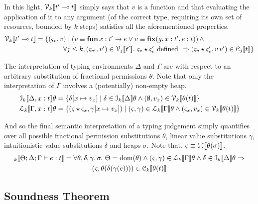In this light, $\mathcal{V}_{k} [\![ t' \multimap t ]\!]$ simply says
that $v$ is a function and that evaluating the application of it to any
argument (of the correct type, requiring its own set of resources, bounded by
$k$ steps) satisfies all the aforementioned properties.
\begin{align*}
    \mathcal{V}_{k} [\![  t' \multimap t  ]\!] &= \{ (\varsigma_v, v ) \mid ( v \equiv \mathbf{fun}\, x : t' \rightarrow e \vee v \equiv \mathbf{fix} (g, x : t' , e : t) ) \, \wedge\\
                            & \qquad \qquad \forall j \leq k, (\varsigma_{v'}, v') \in \mathcal{V}_{j} [\![  t'  ]\!].\ \varsigma_v \star \varsigma_v' \textrm{ defined } \Rightarrow (\varsigma_v \star \varsigma_v', v\, v') \in \mathcal{C}_{j} [\![ t ]\!] \}
\end{align*}

The interpretation of typing environments $\Delta$ and $\Gamma$ are with
respect to an arbitrary substitution of fractional permissions $\theta$. Note
that only the interpretation of $\Gamma$ involves a (potentially) non-empty heap.
\begin{align*}
    \den{I}{k}{ \Delta, x : t } \theta &= \{ \delta[x \mapsto v_x ] \mid \delta \in \den{I}{k}{\Delta}\theta \wedge (\empH, v_x) \in \V{k}{\theta(t)} \} \\
    \den{L}{k}{ \Gamma, x : t } \theta &= \{ (\varsigma \star \varsigma_x, \gamma[x \mapsto v_x ]) \mid (\varsigma, \gamma) \in \den{L}{k}{\Gamma}\theta \wedge (\varsigma_x, v_x) \in \V{k}{\theta(t)} \}
\end{align*}

And so the final semantic interpretation of a typing judgement simply
quantifies over all possible fractional permission substitutions $\theta$,
linear value substitutions $\gamma$, intuitionistic value substitutions
$\delta$ and heaps $\sigma$. Note that, $\varsigma \equiv \mathcal{H}_{} [\![ \theta(\sigma) ]\!]$.
\begin{align*}
\den{}{k}{ \Theta; \Delta ; \Gamma \vdash e : t } &= \forall \theta, \delta, \gamma, \sigma.\ \Theta = \dom(\theta) \wedge (\varsigma, \gamma) \in \den{L}{k}{ \Gamma }\theta \wedge \delta \in \den{I}{k}{ \Delta }\theta \Rightarrow \\
                                                  &  \qquad \qquad (\varsigma, \theta(\delta(\gamma(e)))) \in \C{k}{ \theta(t) }
\end{align*}

\subsection{Soundness Theorem}

